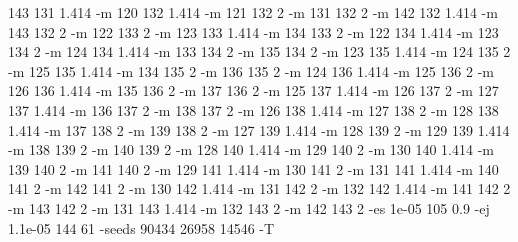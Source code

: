 \documentclass[12pt]{article}
\begin{document}
143 131 1.414 -m 120 132 1.414 -m 121 132 2 -m 131 132 2 -m 142 132 1.414 -m 143 132 2 -m 122 133 2 -m 123 133 1.414 -m 134 133 2 -m 122 134 1.414 -m 123 134 2 -m 124 134 1.414 -m 133 134 2 -m 135 134 2 -m 123 135 1.414 -m 124 135 2 -m 125 135 1.414 -m 134 135 2 -m 136 135 2 -m 124 136 1.414 -m 125 136 2 -m 126 136 1.414 -m 135 136 2 -m 137 136 2 -m 125 137 1.414 -m 126 137 2 -m 127 137 1.414 -m 136 137 2 -m 138 137 2 -m 126 138 1.414 -m 127 138 2 -m 128 138 1.414 -m 137 138 2 -m 139 138 2 -m 127 139 1.414 -m 128 139 2 -m 129 139 1.414 -m 138 139 2 -m 140 139 2 -m 128 140 1.414 -m 129 140 2 -m 130 140 1.414 -m 139 140 2 -m 141 140 2 -m 129 141 1.414 -m 130 141 2 -m 131 141 1.414 -m 140 141 2 -m 142 141 2 -m 130 142 1.414 -m 131 142 2 -m 132 142 1.414 -m 141 142 2 -m 143 142 2 -m 131 143 1.414 -m 132 143 2 -m 142 143 2 -es 1e-05 105 0.9 -ej 1.1e-05 144 61 -seeds 90434 26958 14546 -T

\newpage
\end{document}
